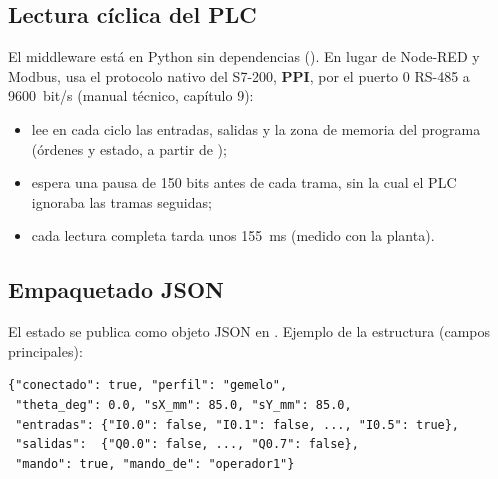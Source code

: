 \documentclass[a4paper,11pt]{article}
\begin{document}
\subsection{Lectura cíclica del PLC}
El middleware está en Python sin dependencias (). En lugar de Node-RED y Modbus, usa el protocolo nativo del S7-200, \textbf{PPI}, por el puerto 0 RS-485 a 9600~bit/s (manual técnico, capítulo 9):
\begin{itemize}
\item lee en cada ciclo las entradas, salidas y la zona de memoria del programa (órdenes y estado, a partir de );
\item espera una pausa de 150 bits antes de cada trama, sin la cual el PLC ignoraba las tramas seguidas;
\item cada lectura completa tarda unos 155~ms (medido con la planta).
\end{itemize}

\subsection{Empaquetado JSON}
El estado se publica como objeto JSON en . Ejemplo de la estructura (campos principales):
\begin{lstlisting}[basicstyle=\ttfamily\scriptsize]
{"conectado": true, "perfil": "gemelo",
 "theta_deg": 0.0, "sX_mm": 85.0, "sY_mm": 85.0,
 "entradas": {"I0.0": false, "I0.1": false, ..., "I0.5": true},
 "salidas":  {"Q0.0": false, ..., "Q0.7": false},
 "mando": true, "mando_de": "operador1"}
\end{lstlisting}
\end{document}
